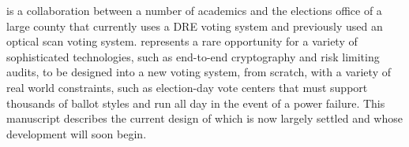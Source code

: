 \projname is a collaboration between a number of academics and
the elections office of a large county that currently uses a DRE
voting system and previously used an optical scan voting system. 
\projname represents a rare opportunity for a variety of
sophisticated technologies, such as end-to-end cryptography and risk limiting
audits, to be designed into a new voting system, from scratch, with
a variety of real world constraints, such as election-day vote centers
that must support thousands of ballot styles and run
all day in the event of a power failure. This manuscript describes the
current design of \projname which is now largely settled and whose
development will soon begin.

